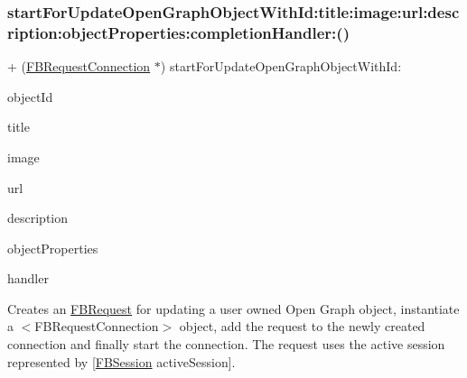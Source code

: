 \subsubsection{\texorpdfstring{start\+For\+Update\+Open\+Graph\+Object\+With\+Id\+:title\+:image\+:url\+:description\+:object\+Properties\+:completion\+Handler\+:()}{startForUpdateOpenGraphObjectWithId:title:image:url:description:objectProperties:completionHandler:()}\hspace{0.1cm}{\footnotesize\ttfamily [3/5]}}
{\footnotesize\ttfamily + (\hyperlink{interfaceFBRequestConnection}{F\+B\+Request\+Connection} $\ast$) start\+For\+Update\+Open\+Graph\+Object\+With\+Id\+: \begin{DoxyParamCaption}\item[{(id)}]{object\+Id }\item[{title:(N\+S\+String $\ast$)}]{title }\item[{image:(id)}]{image }\item[{url:(id)}]{url }\item[{description:(N\+S\+String $\ast$)}]{description }\item[{objectProperties:(N\+S\+Dictionary $\ast$)}]{object\+Properties }\item[{completionHandler:(F\+B\+Request\+Handler)}]{handler }\end{DoxyParamCaption}}

Creates an {\ttfamily \hyperlink{interfaceFBRequest}{F\+B\+Request}} for updating a user owned Open Graph object, instantiate a $<$\+F\+B\+Request\+Connection$>$ object, add the request to the newly created connection and finally start the connection. The request uses the active session represented by {\ttfamily \mbox{[}\hyperlink{interfaceFBSession}{F\+B\+Session} active\+Session\mbox{]}}.


